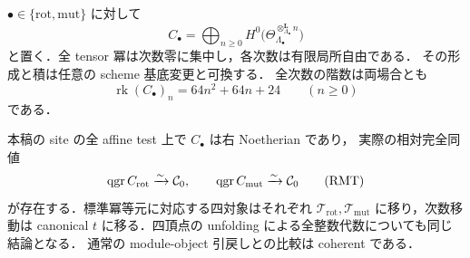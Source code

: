 \begin{theorem}[回転・mutation完成の同じ相対heart]
\label{thm:qa-relative-rot-mut-completion-heart}
$\bullet\in\{\mathrm{rot},\mathrm{mut}\}$ に対して
\[
 C_\bullet=\bigoplus_{n\geq0}
 H^0\bigl(\Theta_{\Lambda_\bullet}^{\otimes_{\Lambda_\bullet}^{\mathbf L}n}\bigr)
\]
と置く．全 tensor 冪は次数零に集中し，各次数は有限局所自由である．
その形成と積は任意の scheme 基底変更と可換する．
全次数の階数は両場合とも
\[
 \operatorname{rk}(C_\bullet)_n=64n^2+64n+24\qquad(n\geq0)
 \tag{RHC}\label{eq:qa-relative-rot-mut-completion-ranks}
\]
である．

本稿の site の全 affine test 上で $C_\bullet$ は右 Noetherian であり，
実際の相対完全同値
\[
 \operatorname{qgr} C_{\mathrm{rot}}\xrightarrow{\sim}\mathcal C_0,
 \qquad
 \operatorname{qgr} C_{\mathrm{mut}}\xrightarrow{\sim}\mathcal C_0
 \tag{RMT}\label{eq:qa-relative-rot-mut-tails}
\]
が存在する．標準冪等元に対応する四対象はそれぞれ
$\mathcal T_{\mathrm{rot}},\mathcal T_{\mathrm{mut}}$ に移り，次数移動は canonical
$t$ に移る．四頂点の unfolding による全整数代数についても同じ結論となる．
通常の module-object 引戻しとの比較は coherent である．
\end{theorem}
